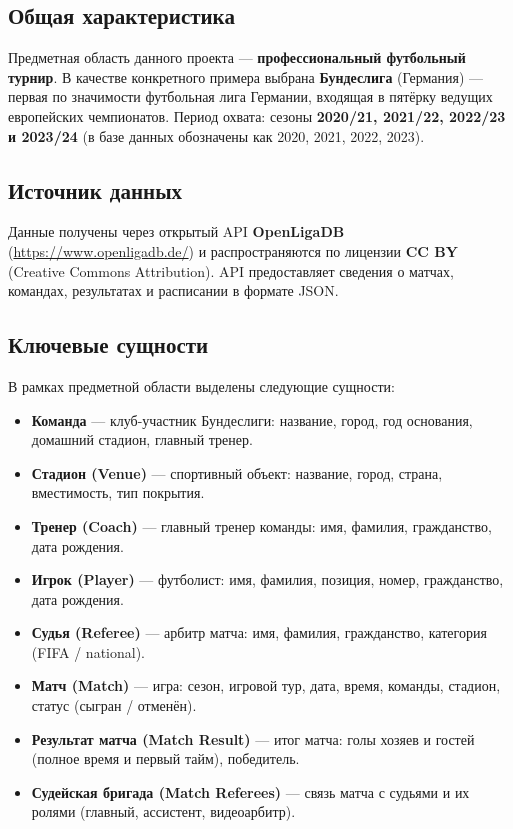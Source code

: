 \documentclass[14pt,a4paper]{extarticle}
\begin{document}
\subsection{Общая характеристика}

Предметная область данного проекта — \textbf{профессиональный футбольный турнир}.
В качестве конкретного примера выбрана \textbf{Бундеслига} (Германия) — первая по
значимости футбольная лига Германии, входящая в пятёрку ведущих европейских
чемпионатов. Период охвата: сезоны \textbf{2020/21, 2021/22, 2022/23 и 2023/24}
(в базе данных обозначены как 2020, 2021, 2022, 2023).

\subsection{Источник данных}

Данные получены через открытый API \textbf{OpenLigaDB}
(\url{https://www.openligadb.de/}) и распространяются по лицензии
\textbf{CC BY} (Creative Commons Attribution). API предоставляет сведения
о матчах, командах, результатах и расписании в формате JSON.

\subsection{Ключевые сущности}

В рамках предметной области выделены следующие сущности:

\begin{itemize}
  \item \textbf{Команда} — клуб-участник Бундеслиги: название, город,
        год основания, домашний стадион, главный тренер.
  \item \textbf{Стадион (Venue)} — спортивный объект: название, город, страна,
        вместимость, тип покрытия.
  \item \textbf{Тренер (Coach)} — главный тренер команды: имя, фамилия,
        гражданство, дата рождения.
  \item \textbf{Игрок (Player)} — футболист: имя, фамилия, позиция,
        номер, гражданство, дата рождения.
  \item \textbf{Судья (Referee)} — арбитр матча: имя, фамилия,
        гражданство, категория (FIFA / national).
  \item \textbf{Матч (Match)} — игра: сезон, игровой тур, дата, время,
        команды, стадион, статус (сыгран / отменён).
  \item \textbf{Результат матча (Match Result)} — итог матча: голы хозяев
        и гостей (полное время и первый тайм), победитель.
  \item \textbf{Судейская бригада (Match Referees)} — связь матча с
        судьями и их ролями (главный, ассистент, видеоарбитр).
\end{itemize}
\end{document}
